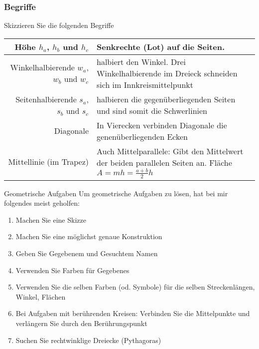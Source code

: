 \newpage
\subsubsection{Begriffe}

Skizzieren Sie die folgenden Begriffe

\begin{tabular}{rp{90mm}}
  Höhe $h_a$, $h_b$ und $h_c$ & Senkrechte (Lot) auf die Seiten.\\\hline
  
  Winkelhalbierende $w_a$, $w_b$ und $w_c$ & halbiert den Winkel. Drei
    Winkelhalbierende im Dreieck schneiden sich im Innkreismittelpunkt\\\hline

    Seitenhalbierende $s_a$, $s_b$ und $s_c$ & halbieren die
  gegenüberliegenden Seiten und sind somit die
  Schwerlinien\index{Schwerlinie}\\\hline
  
  Diagonale & In Vierecken verbinden Diagonale die genenüberliegenden
  Ecken\\\hline

  Mittellinie (im Trapez) & Auch Mittelparallele: Gibt den Mittelwert
  der beiden parallelen Seiten an. Fläche $A = mh = \frac{a+b}2h$
\end{tabular}

\newpage

\begin{rezept}{Geometrische Aufgaben}{}
Um geometrische Aufgaben zu lösen, hat bei mir folgendes meist geholfen:

\begin{enumerate}
\item Machen Sie eine Skizze
\item Machen Sie eine möglichst genaue Konstruktion
\item Geben Sie Gegebenem und Gesuchtem Namen
\item Verwenden Sie Farben für Gegebenes
\item Verwenden Sie die selben Farben (od. Symbole) für die selben Streckenlängen, Winkel, Flächen
\item Bei Aufgaben mit berührenden Kreisen: Verbinden Sie die
  Mittelpunkte und verlängern Sie durch den Berührungspunkt
\item Suchen Sie rechtwinklige Dreiecke (Pythagoras)

\end{enumerate}
\end{rezept}


